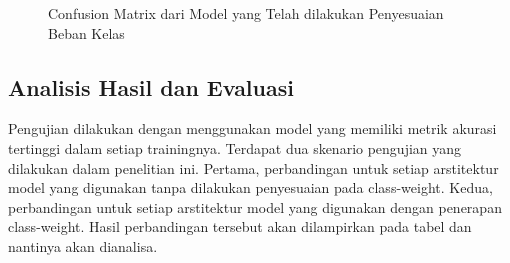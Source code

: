 \begin{figure}
    \centering
    \qquad
    \qquad
    \caption{Confusion Matrix dari Model yang Telah dilakukan Penyesuaian Beban Kelas}%
    \label{fig:confRes152Class}
\end{figure}

\newpage

\subsection{Analisis Hasil dan Evaluasi}
Pengujian dilakukan dengan menggunakan model yang memiliki metrik akurasi tertinggi dalam setiap trainingnya. Terdapat dua skenario pengujian yang dilakukan dalam penelitian ini. Pertama, perbandingan untuk setiap arstitektur model yang digunakan tanpa dilakukan penyesuaian pada class-weight. Kedua, perbandingan untuk setiap arstitektur model yang digunakan dengan penerapan class-weight. Hasil perbandingan tersebut akan dilampirkan pada tabel dan nantinya akan dianalisa.